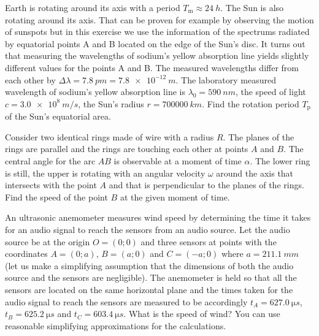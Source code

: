 \documentclass[11pt]{article}
\begin{document}

\probeng
Earth is rotating around its axis with a period $T_\text{m}\approx\SI{24}{h}$. The Sun is also rotating around its axis. That can be proven for example by observing the motion of sunspots but in this exercise we use the information of the spectrums radiated by equatorial points A and B located on the edge of the Sun’s disc. It turns out that measuring the wavelengths of sodium’s yellow absorption line yields slightly different values for the points A and B. The measured wavelengths differ from each other by $\Delta \lambda = \SI{7.8}{pm}=\SI{7.8e-12}{m}$. The laboratory measured wavelength of sodium’s yellow absorption line is $\lambda_0=\SI{590}{nm}$, the speed of light $c=\SI{3.0e8}{m/s}$, the Sun’s radius $r=\SI{700000}{km}$. Find the rotation period $T_\text{p}$ of the Sun’s equatorial area.
\probend
\bigskip


\probeng
Consider two identical rings made of wire with a radius $R$. The planes of the rings are parallel and the rings are touching each other at points $A$ and $B$. The central angle for the arc $AB$ is observable at a moment of time $\alpha$. The lower ring is still, the upper is rotating with an angular velocity $\omega$ around the axis that intersects with the point $A$ and that is perpendicular to the planes of the rings. Find the speed of the point $B$ at the given moment of time.
\probend
\bigskip


\probeng
An ultrasonic anemometer measures wind speed by determining the time it takes for an audio signal to reach the sensors from an audio source. Let the audio source be at the origin $O=(0;0)$ and three sensors at points with the coordinates $A=(0;a)$, $B=(a;0)$ and $C=(-a;0)$ where $a=\SI{211.1}{mm}$ (let us make a simplifying assumption that the dimensions of both the audio source and the sensors are negligible). The anemometer is held so that all the sensors are located on the same horizontal plane and the times taken for the audio signal to reach the sensors are measured to be accordingly $t_A=\SI{627,0}{\micro s}$, $t_B=\SI{625,2}{\micro s}$ and $t_C=\SI{603,4}{\micro s}$. What is the speed of wind? You can use reasonable simplifying approximations for the calculations.
\probend
\bigskip
\end{document}

